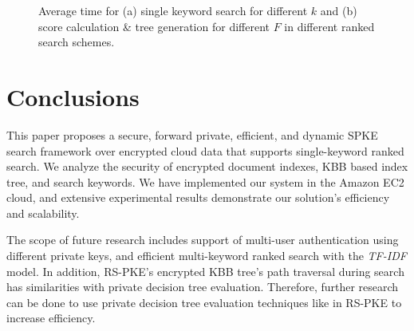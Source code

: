 \documentclass[sigconf,pdftex]{acmart}
\begin{document}
\begin{figure}
    \centering
    \hfill
  \caption{\small{Average time for (a) single keyword search for different $k$ and (b) score calculation \& tree generation for different $F$ in different ranked search schemes.}}
  \label{fig:comparisonFig}
\end{figure}







\section{Conclusions}\label{conclusion}
This paper proposes a secure, forward private, efficient, and dynamic SPKE search framework over encrypted cloud data that supports single-keyword ranked search. We analyze the security of encrypted document indexes, KBB based index tree, and search keywords. We have implemented our system in the Amazon EC2 cloud, and extensive experimental results demonstrate our solution's efficiency and scalability.

The scope of future research includes support of multi-user authentication using different private keys, and efficient multi-keyword ranked search with the \textit{TF-IDF} model. In addition, RS-PKE's encrypted KBB tree's path traversal during search has similarities with private decision tree evaluation. Therefore, further research can be done to use private decision tree evaluation techniques like \cite{kiss2019sok} in RS-PKE to increase efficiency.
\end{document}
